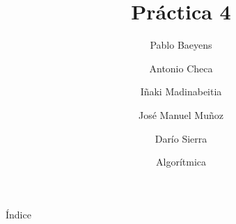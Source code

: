 \documentclass[10pt,compress,usetitleprogressbar,mathserif]{beamer}
\title{Práctica 4}
\author{Pablo Baeyens \and Antonio Checa \and Iñaki Madinabeitia \and José Manuel Muñoz \and Darío Sierra}
\date{Algorítmica}
\begin{document}
\maketitle

\begin{frame}{Índice}
  \tableofcontents
\end{frame}
%

\end{document}
